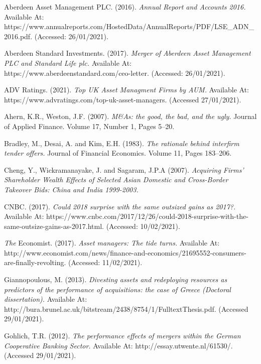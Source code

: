 \documentclass[11pt, english]{article}
\begin{document}
\begin{thebibliography}{9}

		Aberdeen Asset Management PLC. (2016).
		\textsl{Annual Report and Accounts 2016.}
		Available At: https://www.annualreports.com/HostedData/AnnualReports/PDF/LSE\_ADN\_ 2016.pdf. (Accessed: 26/01/2021).

		Aberdeen Standard Investments. (2017).
		\textsl{Merger of Aberdeen Asset Management PLC and Standard Life plc.}
		Available At: https://www.aberdeenstandard.com/ceo-letter. (Accessed: 26/01/2021).

		ADV Ratings. (2021).
		\textsl{Top UK Asset Managment Firms by AUM.}
		Available At: https://www.advratings.com/top-uk-asset-managers. (Accessed 27/01/2021).
	
		Ahern, K.R., Weston, J.F. (2007).
		\textsl{M\&As: the good, the bad, and the ugly.}
		Journal of Applied Finance. Volume 17, Number 1, Pages 5--20.

		Bradley, M., Desai, A. and Kim, E.H. (1983).
		\textsl{The rationale behind interfirm tender offers.}
		Journal of Financial Economics. Volume 11, Pages 183--206.

		Cheng, Y., Wickramanayake, J. and Sagaram, J.P.A (2007).
		\textsl{Acquiring Firms’ Shareholder Wealth Effects of Selected Asian Domestic and Cross-Border Takeover Bids: China and India 1999-2003.}

		CNBC. (2017).
		\textsl{Could 2018 surprise with the same outsized gains as 2017?.}
		Available At: https://www.cnbc.com/2017/12/26/could-2018-surprise-with-the-same-outsize-gains-as-2017.html. (Accessed: 10/02/2021).

		\textit{The} Economist. (2017).
		\textsl{Asset managers: The tide turns.}
		Available At: http://www.economist.com/news/finance-and-economics/21695552-consumers-are-finally-revolting. (Accessed: 11/02/2021).

        	Giannopoulous, M. (2013).
		\textsl{Divesting assets and redeploying resources as predictors of the performance of acquisitions: the case of Greece (Doctoral dissertation).}
		Available At: http://bura.brunel.ac.uk/bitstream/2438/8754/1/FulltextThesis.pdf. (Accessed 29/01/2021).

        	Gohlich, T.R. (2012).
		\textsl{The performance effects of mergers within the German Cooperative Banking Sector.}
		Available At: http://essay.utwente.nl/61530/. (Accessed 29/01/2021).


\end{thebibliography}
\end{document}
